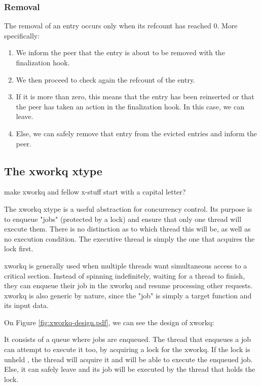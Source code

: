 \subsubsection{Removal}

The removal of an entry occurs only when its refcount has reached 0. More 
specifically:

\begin{enumerate}
	\item We inform the peer that the entry is about to be removed with the
		finalization hook.
	\item We then proceed to check again the refcount of the entry.
	\item If it is more than zero, this means that the entry has been 
		reinserted or that the peer has taken an action in the 
		finalization hook. In this case, we can leave.
	\item Else, we can safely remove that entry from the evicted entries and 
		inform the peer.
\end{enumerate}

\subsection{The xworkq xtype}\label{sec:xworkq-design}

\fixme make xworkq and fellow x-stuff start with a capital letter?

The xworkq xtype is a useful abstraction for concurrency control. Its purpose 
is to enqueue "jobs" (protected by a lock) and ensure that only one thread will 
execute them. There is no distinction as to which thread this will be, as well 
as no execution condition. The executive thread is simply the one that acquires 
the lock first.

xworkq is generally used when multiple threads want simultaneous access to a 
critical section. Instead of spinning indefinitely, waiting for a thread to 
finish, they can enqueue their job in the xworkq and resume processing other 
requests. xworkq is also generic by nature, since the "job" is simply a target 
function and its input data.

On Figure \ref{fig:xworkq-design.pdf}, we can see the design of xworkq:


It consists of a queue where jobs are enqueued.  The thread that enqueues a job 
can attempt to execute it too, by acquiring a lock for the xworkq. If the lock 
is unheld%
, the thread will acquire it and will be able to execute the enqueued job.  
Else, it can safely leave and its job will be executed by the thread that holds 
the lock.

